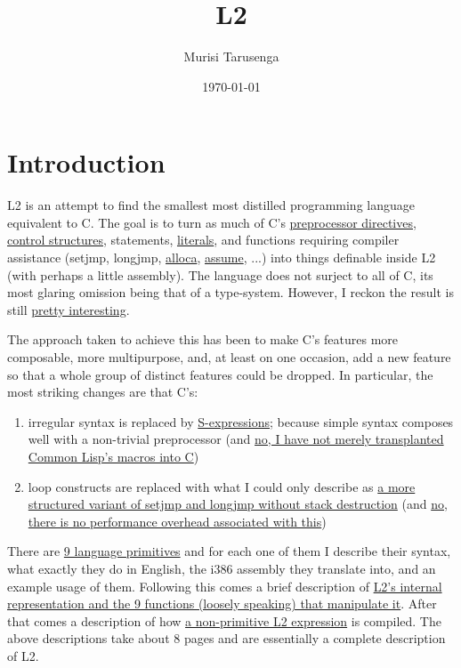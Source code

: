 \documentclass[twocolumn,landscape]{article}
\begin{document}
  \title{L2}
  \author{Murisi Tarusenga}
  \date{\today{} \currenttime}
  \maketitle
  \section{Introduction}\label{sec:introduction}
    L2 is an attempt to find the smallest most distilled programming language equivalent to C. The goal is to turn as much of C's \hyperref[sec:conditional-compilation]{preprocessor directives}, \hyperref[sec:switch-expression]{control structures}, statements, \hyperref[sec:strings]{literals}, and functions requiring compiler assistance (setjmp, longjmp, \hyperref[sec:examples]{alloca}, \hyperref[sec:assume]{assume}, ...) into things definable inside L2 (with perhaps a little assembly). The language does not surject to all of C, its most glaring omission being that of a type-system. However, I reckon the result is still \hyperref[sec:closures]{pretty interesting}.

    The approach taken to achieve this has been to make C's features more composable, more multipurpose, and, at least on one occasion, add a new feature so that a whole group of distinct features could be dropped. In particular, the most striking changes are that C's:
    \begin{enumerate}
      \item irregular syntax is replaced by \hyperref[sec:internal-representation]{S-expressions}; because simple syntax composes well with a non-trivial preprocessor (and \hyperref[sec:expression]{no, I have not merely transplanted Common Lisp's macros into C})
      \item loop constructs are replaced with what I could only describe as \hyperref[sec:with]{a more structured variant of setjmp and longjmp without stack destruction} (and \hyperref[sec:an-optimization]{no, there is no performance overhead associated with this})
    \end{enumerate}

    There are \hyperref[sec:primitive-expressions]{9 language primitives} and for each one of them I describe their syntax, what exactly they do in English, the i386 assembly they translate into, and an example usage of them. Following this comes a brief description of \hyperref[sec:internal-representation]{L2's internal representation and the 9 functions (loosely speaking) that manipulate it}. After that comes a description of how \hyperref[sec:expression]{a non-primitive L2 expression} is compiled. The above descriptions take about 8 pages and are essentially a complete description of L2.
\end{document}
